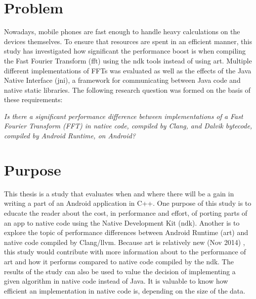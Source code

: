 \section{Problem}
Nowadays, mobile phones are fast enough to handle heavy calculations on the devices themselves. To ensure that resources are spent in an efficient manner, this study has investigated how significant the performance boost is when compiling the Fast Fourier Transform (\gls{fft}) using the \gls{ndk} tools instead of using \gls{art}. Multiple different implementations of FFTs was evaluated as well as the effects of the Java Native Interface (\gls{jni}), a framework for communicating between Java code and native static libraries. The following research question was formed on the basis of these requirements:


\begin{center}
    \textit{Is there a significant performance difference between implementations of a Fast Fourier Transform (FFT) in native code, compiled by Clang, and Dalvik bytecode, compiled by Android Runtime, on Android?}
\end{center}

\section{Purpose}
This thesis is a study that evaluates when and where there will be a gain in writing a part of an Android application in C++. One purpose of this study is to educate the reader about the cost, in performance and effort, of porting parts of an app to native code using the Native Development Kit (\gls{ndk}). Another is to explore the topic of performance differences between Android Runtime (\gls{art}) and native code compiled by Clang/\gls{llvm}. Because \gls{art} is relatively new (Nov 2014) \cite{android:dalvik:release}, this study would contribute with more information about to the performance of \gls{art} and how it performs compared to native code compiled by the \gls{ndk}. The results of the study can also be used to value the decision of implementing a given algorithm in native code instead of Java. It is valuable to know how efficient an implementation in native code is, depending on the size of the data.

